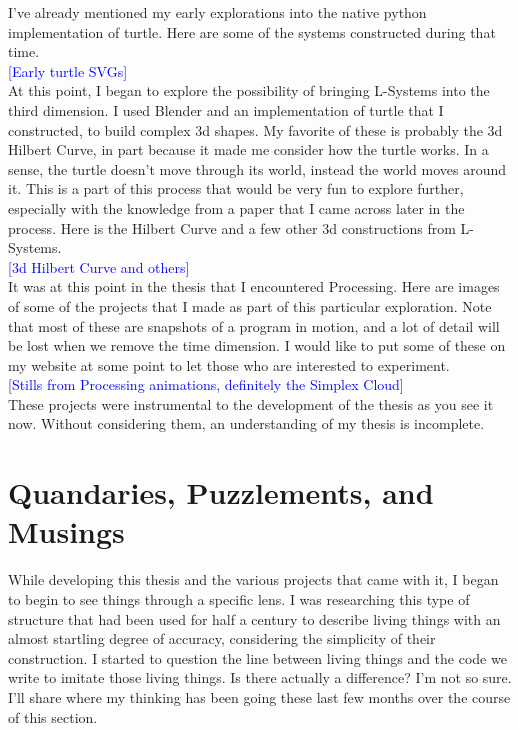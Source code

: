 \documentclass[12pt,twoside]{reedthesis}
\begin{document}
	I've already mentioned my early explorations into the native python implementation of turtle. Here are some of the systems constructed during that time.\\
	
	\textcolor{blue}{[Early turtle SVGs]}\\
	
	At this point, I began to explore the possibility of bringing L-Systems into the third dimension. I used Blender and an implementation of turtle that I constructed, to build complex 3d shapes. My favorite of these is probably the 3d Hilbert Curve, in part because it made me consider how the turtle works. In a sense, the turtle doesn't move through its world, instead the world moves around it. This is a part of this process that would be very fun to explore further, especially with the knowledge from a paper that I came across later in the process. Here is the Hilbert Curve and a few other 3d constructions from L-Systems.\\
	
	\textcolor{blue}{[3d Hilbert Curve and others]}\\
	
	It was at this point in the thesis that I encountered Processing. Here are images of some of the projects that I made as part of this particular exploration. Note that most of these are snapshots of a program in motion, and a lot of detail will be lost when we remove the time dimension. I would like to put some of these on my website at some point to let those who are interested to experiment.\\
	
	\textcolor{blue}{[Stills from Processing animations, definitely the Simplex Cloud]}\\
	
	These projects were instrumental to the development of the thesis as you see it now. Without considering them, an understanding of my thesis is incomplete.

\section{Quandaries, Puzzlements, and Musings}
\label{Questions}

	While developing this thesis and the various projects that came with it, I began to begin to see things through a specific lens. I was researching this type of structure that had been used for half a century to describe living things with an almost startling degree of accuracy, considering the simplicity of their construction. I started to question the line between living things and the code we write to imitate those living things. Is there actually a difference? I'm not so sure. I'll share where my thinking has been going these last few months over the course of this section.
	
\end{document}
